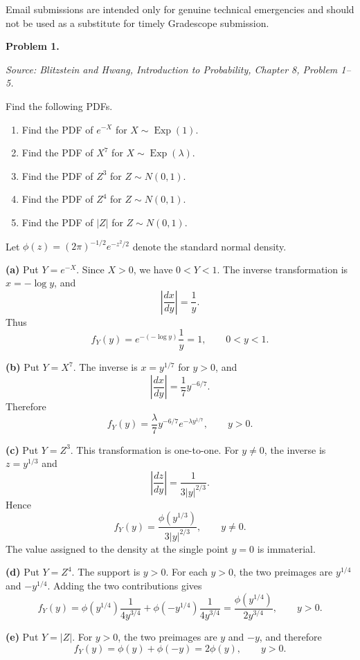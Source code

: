 \documentclass[11pt]{article}
\newcommand{\source}[2]{%
    \vspace{0.15cm}
    {\small\textit{Source: Blitzstein and Hwang, \textit{Introduction to Probability}, Chapter #1, Problem #2.}}
}
\begin{document}
Email submissions are intended only for genuine technical emergencies and should not be used as a substitute for timely Gradescope submission.

\newpage


\begin{problemheader}
\textbf{Problem 1.}
\end{problemheader}
\source{8}{1--5}

Find the following PDFs.

\begin{enumerate}[label=(\alph*), leftmargin=*]
    \item Find the PDF of $e^{-X}$ for $X\sim \operatorname{Exp}(1)$.

    \item Find the PDF of $X^7$ for $X\sim \operatorname{Exp}(\lambda)$.

    \item Find the PDF of $Z^3$ for $Z\sim N(0,1)$.

    \item Find the PDF of $Z^4$ for $Z\sim N(0,1)$.

    \item Find the PDF of $|Z|$ for $Z\sim N(0,1)$.
\end{enumerate}

\begin{solutionbox}
Let $\phi(z)=(2\pi)^{-1/2}e^{-z^2/2}$ denote the standard normal density.

\textbf{(a)} Put $Y=e^{-X}$. Since $X>0$, we have $0<Y<1$. The inverse transformation is $x=-\log y$, and
\[
\left|\frac{dx}{dy}\right|=\frac1y.
\]
Thus
\[
f_Y(y)=e^{-(-\log y)}\frac1y=1,
\qquad 0<y<1.
\]
 

\textbf{(b)} Put $Y=X^7$. The inverse is $x=y^{1/7}$ for $y>0$, and
\[
\left|\frac{dx}{dy}\right|=\frac{1}{7}y^{-6/7}.
\]
Therefore
\[
f_Y(y)=\frac{\lambda}{7}y^{-6/7}e^{-\lambda y^{1/7}},
\qquad y>0.
\]

 

\textbf{(c)} Put $Y=Z^3$. This transformation is one-to-one. For $y\ne0$, the inverse is $z=y^{1/3}$ and
\[
\left|\frac{dz}{dy}\right|=\frac{1}{3|y|^{2/3}}.
\]
Hence
\[
f_Y(y)=\frac{\phi(y^{1/3})}{3|y|^{2/3}},
\qquad y\ne0.
\]
The value assigned to the density at the single point $y=0$ is immaterial.

 

\textbf{(d)} Put $Y=Z^4$. The support is $y>0$. For each $y>0$, the two preimages are $y^{1/4}$ and $-y^{1/4}$. Adding the two contributions gives
\[
f_Y(y)
=
\phi(y^{1/4})\frac{1}{4y^{3/4}}
+
\phi(-y^{1/4})\frac{1}{4y^{3/4}}
=
\frac{\phi(y^{1/4})}{2y^{3/4}},
\qquad y>0.
\]

 

\textbf{(e)} Put $Y=|Z|$. For $y>0$, the two preimages are $y$ and $-y$, and therefore
\[
f_Y(y)=\phi(y)+\phi(-y)=2\phi(y),
\qquad y>0.
\]

 
\end{solutionbox}
\newpage
\end{document}
